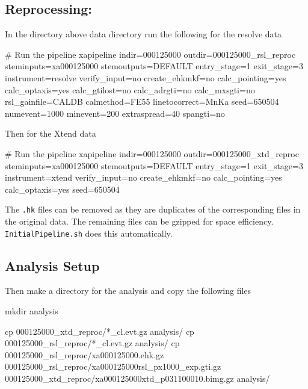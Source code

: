 \documentclass[
  letterpaper,
  DIV=11,
  numbers=noendperiod]{scrreprt}
\newenvironment{Shaded}{\begin{snugshade}}{\end{snugshade}}
\newcommand{\CommentTok}[1]{\textcolor[rgb]{0.37,0.37,0.37}{#1}}
\newcommand{\ExtensionTok}[1]{\textcolor[rgb]{0.00,0.23,0.31}{#1}}
\newcommand{\FunctionTok}[1]{\textcolor[rgb]{0.28,0.35,0.67}{#1}}
\newcommand{\NormalTok}[1]{\textcolor[rgb]{0.00,0.23,0.31}{#1}}
\newcommand{\PreprocessorTok}[1]{\textcolor[rgb]{0.68,0.00,0.00}{#1}}
\begin{document}
\subsection{Reprocessing:}\label{reprocessing}

In the directory above data directory run the following for the resolve
data

\begin{Shaded}
\begin{Highlighting}[]
\CommentTok{\# Run the pipeline}
\ExtensionTok{xapipeline}\NormalTok{ indir=000125000 outdir=000125000\_rsl\_reproc steminputs=xa000125000 stemoutputs=DEFAULT entry\_stage=1 exit\_stage=3 instrument=resolve verify\_input=no create\_ehkmkf=no calc\_pointing=yes calc\_optaxis=yes calc\_gtilost=no calc\_adrgti=no calc\_mxsgti=no rsl\_gainfile=CALDB calmethod=FE55 linetocorrect=MnKa seed=650504 numevent=1000 minevent=200 extraspread=40 spangti=no}
\end{Highlighting}
\end{Shaded}

Then for the Xtend data

\begin{Shaded}
\begin{Highlighting}[]
\CommentTok{\# Run the pipeline}
\ExtensionTok{xapipeline}\NormalTok{ indir=000125000 outdir=000125000\_xtd\_reproc steminputs=xa000125000 stemoutputs=DEFAULT entry\_stage=1 exit\_stage=3 instrument=xtend verify\_input=no create\_ehkmkf=no calc\_pointing=yes calc\_optaxis=yes seed=650504}
\end{Highlighting}
\end{Shaded}

The \texttt{.hk} files can be removed as they are duplicates of the
corresponding files in the original data. The remaining files can be
gzipped for space efficiency. \texttt{InitialPipeline.sh} does this
automatically.

\subsection{Analysis Setup}\label{analysis-setup}

Then make a directory for the analysis and copy the following files

\begin{Shaded}
\begin{Highlighting}[]
\FunctionTok{mkdir}\NormalTok{ analysis}

\FunctionTok{cp}\NormalTok{ 000125000\_xtd\_reproc/}\PreprocessorTok{*}\NormalTok{\_cl.evt.gz analysis/}
\FunctionTok{cp}\NormalTok{ 000125000\_rsl\_reproc/}\PreprocessorTok{*}\NormalTok{\_cl.evt.gz analysis/}
\FunctionTok{cp}\NormalTok{ 000125000\_rsl\_reproc/xa000125000.ehk.gz 000125000\_rsl\_reproc/xa000125000rsl\_px1000\_exp.gti.gz 000125000\_xtd\_reproc/xa000125000xtd\_p031100010.bimg.gz analysis/}
\end{Highlighting}
\end{Shaded}
\end{document}
